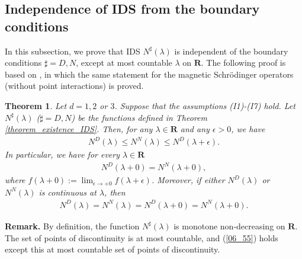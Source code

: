 \documentclass[12pt,a4paper]{article}
\newtheorem{theorem}{Theorem}[section]
\begin{document}
\subsection{Independence of IDS from the boundary conditions}
In this subsection,
we prove that IDS $N^\sharp(\lambda)$
is independent of the boundary conditions $\sharp=D,N$,
except at most countable $\lambda$ on $\mathbf{R}$.
The following proof is based on \cite{Do-Iw-Mi},
in which the same statement
for the magnetic Schr\"odinger operators 
(without point interactions) is proved.



\begin{theorem}
 \label{theorem_independence_IDS}
Let $d=1,2$ or $3$.
Suppose that the assumptions (I1)-(I7) hold.
Let $N^\sharp(\lambda)$ ($\sharp=D,N$) be the functions defined in 
Theorem \ref{theorem_existence_IDS}.
Then, for any $\lambda\in \mathbf{R}$ and any $\epsilon>0$,
we have
\begin{align}
 \label{06_53}
N^D(\lambda)\leq N^N(\lambda) \leq N^D(\lambda+\epsilon).
\end{align}
In particular, 
we have for every $\lambda\in \mathbf{R}$
\begin{align}
\label{06_54}
N^D(\lambda+0)= N^N(\lambda+0),
\end{align}
where $f(\lambda+0):=\lim_{\epsilon\to+0}f(\lambda +\epsilon)$.
Moreover, 
if either $N^D(\lambda)$ or $N^N(\lambda)$ is continuous at $\lambda$,
then 
\begin{align}
\label{06_55}
N^D(\lambda)= N^N(\lambda)=N^D(\lambda+0)=N^N(\lambda+0).
\end{align}
\end{theorem}
\noindent\textbf{Remark.} 
By definition, the function $N^\sharp(\lambda)$ 
is monotone non-decreasing on $\mathbf{R}$.
The set of points of discontinuity is at most countable,
and (\ref{06_55}) holds except this at most countable set of points 
of discontinuity.
\end{document}
